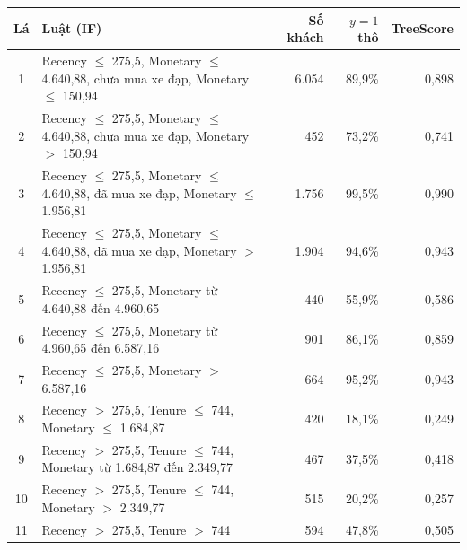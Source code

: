 \begin{tabular}{cp{8.6cm}rrr}
\toprule
Lá & Luật (IF) & Số khách & $y=1$ thô & TreeScore \\
\midrule
1 & Recency $\leq$ 275,5, Monetary $\leq$ 4.640,88, chưa mua xe đạp, Monetary $\leq$ 150,94 & 6.054 & 89,9\% & 0,898 \\
2 & Recency $\leq$ 275,5, Monetary $\leq$ 4.640,88, chưa mua xe đạp, Monetary $>$ 150,94 & 452 & 73,2\% & 0,741 \\
3 & Recency $\leq$ 275,5, Monetary $\leq$ 4.640,88, đã mua xe đạp, Monetary $\leq$ 1.956,81 & 1.756 & 99,5\% & 0,990 \\
4 & Recency $\leq$ 275,5, Monetary $\leq$ 4.640,88, đã mua xe đạp, Monetary $>$ 1.956,81 & 1.904 & 94,6\% & 0,943 \\
5 & Recency $\leq$ 275,5, Monetary từ 4.640,88 đến 4.960,65 & 440 & 55,9\% & 0,586 \\
6 & Recency $\leq$ 275,5, Monetary từ 4.960,65 đến 6.587,16 & 901 & 86,1\% & 0,859 \\
7 & Recency $\leq$ 275,5, Monetary $>$ 6.587,16 & 664 & 95,2\% & 0,943 \\
8 & Recency $>$ 275,5, Tenure $\leq$ 744, Monetary $\leq$ 1.684,87 & 420 & 18,1\% & 0,249 \\
9 & Recency $>$ 275,5, Tenure $\leq$ 744, Monetary từ 1.684,87 đến 2.349,77 & 467 & 37,5\% & 0,418 \\
10 & Recency $>$ 275,5, Tenure $\leq$ 744, Monetary $>$ 2.349,77 & 515 & 20,2\% & 0,257 \\
11 & Recency $>$ 275,5, Tenure $>$ 744 & 594 & 47,8\% & 0,505 \\
\bottomrule
\end{tabular}
